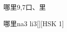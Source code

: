 \begin{entry}{哪里}{9,7}{⼝、⾥}
  \begin{phonetics}{哪里}{na3 li3}[][HSK 1]
  \end{phonetics}
\end{entry}
